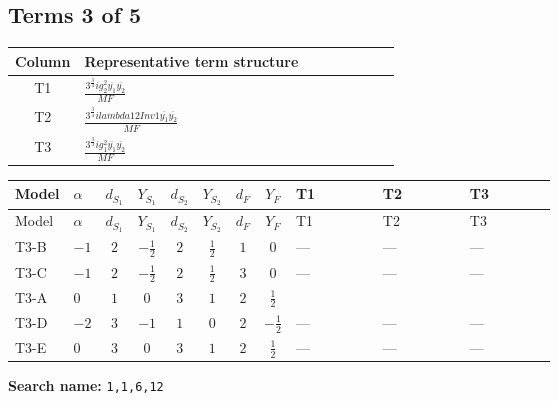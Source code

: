 \documentclass[8pt]{article}
\begin{document}
\begin{landscape}
\subsection*{Terms 3 of 5}
\begin{center}
\begin{tabular}{@{}c >{\raggedright\arraybackslash}p{0.82\linewidth}@{}}
\toprule
Column & Representative term structure \\
\midrule
T1 & \(\displaystyle \frac{3^{\frac{3}{4}} i g_{2}^{2} \overline{y_{1}} \overline{y_{2}}}{MF}\) \\
\midrule
T2 & \(\displaystyle \frac{3^{\frac{3}{4}} i lambda12Inv1 \overline{y_{1}} \overline{y_{2}}}{MF}\) \\
\midrule
T3 & \(\displaystyle \frac{3^{\frac{3}{4}} i g_{1}^{2} \overline{y_{1}} \overline{y_{2}}}{MF}\) \\
\midrule
\bottomrule
\end{tabular}
\end{center}
\smallskip
\tiny
\begin{longtable}{@{}llcccccc >{\raggedright\arraybackslash}p{0.21\linewidth} >{\raggedright\arraybackslash}p{0.21\linewidth} >{\raggedright\arraybackslash}p{0.21\linewidth}@{}}
\toprule
Model & $\alpha$ & $d_{S_1}$ & $Y_{S_1}$ & $d_{S_2}$ & $Y_{S_2}$ & $d_F$ & $Y_F$ & T1 & T2 & T3 \\
\midrule
\endfirsthead
\toprule
Model & $\alpha$ & $d_{S_1}$ & $Y_{S_1}$ & $d_{S_2}$ & $Y_{S_2}$ & $d_F$ & $Y_F$ & T1 & T2 & T3 \\
\midrule
\endhead
T3-B & $-1$ & $2$ & $-\frac{1}{2}$ & $2$ & $\frac{1}{2}$ & $1$ & $0$ & --- & --- & --- \\
\midrule
T3-C & $-1$ & $2$ & $-\frac{1}{2}$ & $2$ & $\frac{1}{2}$ & $3$ & $0$ & --- & --- & --- \\
\midrule
T3-A & $0$ & $1$ & $0$ & $3$ & $1$ & $2$ & $\frac{1}{2}$ & \scriptsize\adjustbox{max width=\linewidth}{$\begin{gathered} - \frac{17 \cdot 3^{\frac{3}{4}} i g_{2}^{2} \overline{y_{1}} \overline{y_{2}}}{24 MF}\end{gathered}$} & \scriptsize\adjustbox{max width=\linewidth}{$\begin{gathered} - \frac{3^{\frac{3}{4}} i lambda12Inv1 \overline{y_{1}} \overline{y_{2}}}{6 MF}\end{gathered}$} & \scriptsize\adjustbox{max width=\linewidth}{$\begin{gathered} - \frac{3^{\frac{3}{4}} i g_{1}^{2} \overline{y_{1}} \overline{y_{2}}}{8 MF}\end{gathered}$} \\
\midrule
T3-D & $-2$ & $3$ & $-1$ & $1$ & $0$ & $2$ & $-\frac{1}{2}$ & --- & --- & --- \\
\midrule
T3-E & $0$ & $3$ & $0$ & $3$ & $1$ & $2$ & $\frac{1}{2}$ & --- & --- & --- \\
\midrule
\bottomrule
\end{longtable}
\clearpage
\noindent\textbf{Search name: }\texttt{1,1,6,12}\par\smallskip

\end{landscape}
\end{document}
